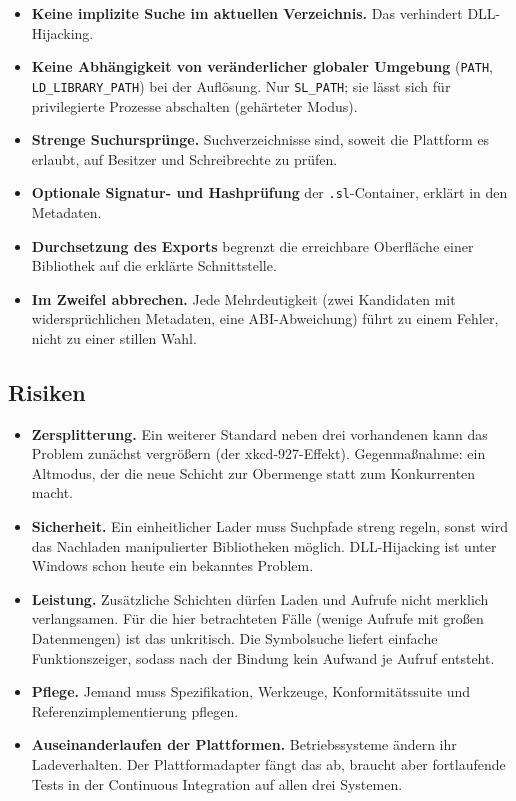 \begin{itemize}
	\item \textbf{Keine implizite Suche im aktuellen Verzeichnis.} Das verhindert DLL-Hijacking.
	\item \textbf{Keine Abhängigkeit von veränderlicher globaler Umgebung} (\texttt{PATH}, \texttt{LD\_LIBRARY\_PATH}) bei der Auflösung. Nur \texttt{SL\_PATH}; sie lässt sich für privilegierte Prozesse abschalten (gehärteter Modus).
	\item \textbf{Strenge Suchursprünge.} Suchverzeichnisse sind, soweit die Plattform es erlaubt, auf Besitzer und Schreibrechte zu prüfen.
	\item \textbf{Optionale Signatur- und Hashprüfung} der \texttt{.sl}-Container, erklärt in den Metadaten.
	\item \textbf{Durchsetzung des Exports} begrenzt die erreichbare Oberfläche einer Bibliothek auf die erklärte Schnittstelle.
	\item \textbf{Im Zweifel abbrechen.} Jede Mehrdeutigkeit (zwei Kandidaten mit widersprüchlichen Metadaten, eine ABI-Abweichung) führt zu einem Fehler, nicht zu einer stillen Wahl.
\end{itemize}

\subsection{Risiken}

\begin{itemize}
	\item \textbf{Zersplitterung.} Ein weiterer Standard neben drei vorhandenen kann das Problem zunächst vergrößern (der \glqq xkcd-927-Effekt\grqq). Gegenmaßnahme: ein Altmodus, der die neue Schicht zur Obermenge statt zum Konkurrenten macht.
	\item \textbf{Sicherheit.} Ein einheitlicher Lader muss Suchpfade streng regeln, sonst wird das Nachladen manipulierter Bibliotheken möglich. DLL-Hijacking ist unter Windows schon heute ein bekanntes Problem.
	\item \textbf{Leistung.} Zusätzliche Schichten dürfen Laden und Aufrufe nicht merklich verlangsamen. Für die hier betrachteten Fälle (wenige Aufrufe mit großen Datenmengen) ist das unkritisch. Die Symbolsuche liefert einfache Funktionszeiger, sodass nach der Bindung kein Aufwand je Aufruf entsteht.
	\item \textbf{Pflege.} Jemand muss Spezifikation, Werkzeuge, Konformitätssuite und Referenzimplementierung pflegen.
	\item \textbf{Auseinanderlaufen der Plattformen.} Betriebssysteme ändern ihr Ladeverhalten. Der Plattformadapter fängt das ab, braucht aber fortlaufende Tests in der Continuous Integration auf allen drei Systemen.
\end{itemize}

